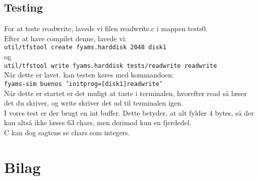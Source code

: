 \documentclass[a4paper,12pt]{article}
\begin{document}
\subsection*{Testing}
For at teste readwrite, lavede vi filen readwrite.c i mappen tests0.
\\
Efter at have compilet denne, lavede vi:
\\
\texttt{util/tfstool create fyams.harddisk 2048 disk1}
\\
og
\\
\texttt{util/tfstool write fyams.harddisk tests/readwrite readwrite}
\\[5px]
Når dette er lavet. kan testen køres med kommandoen: 
\\
\texttt{fyams-sim buenos 'initprog=[disk1]readwrite'}
\\
Når dette er startet er det muligt at taste i terminalen, hvorefter read så læser det du skriver, og write skriver det ud til terminalen igen. 
\\
I vores test er der brugt en int buffer. Dette betyder, at alt fylder 4 bytes, så der kan altså ikke læses 63 chars, men derimod kun en fjerdedel. 
\\
C kan dog sagtens se chars som integers.

\section*{Bilag}
\end{document}
